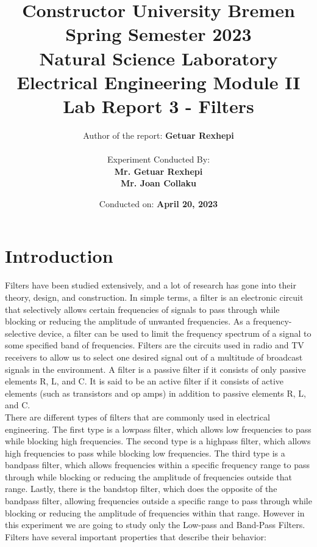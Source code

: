 \documentclass[12pt]{report}
\title{
    \textbf{Constructor University Bremen} \\
Spring Semester 2023 \\
\vspace{1cm}
\textbf{Natural Science Laboratory\\
Electrical Engineering Module II\\}
    \vspace{1cm}
    \textbf{Lab Report 3 - Filters} \\ 
    
}
\author{
    Author of the report: \textbf{Getuar Rexhepi} \\
    \vspace{1cm} \\
    Experiment Conducted By: \\ \textbf{Mr. Getuar Rexhepi} \\
\textbf{Mr. Joan Collaku}
}
\date{Conducted on: \textbf{April 20, 2023}}
\begin{document}
\maketitle 

\chapter{Introduction}
 Filters have been studied extensively, and a lot of research has gone into their theory, design, and construction. In simple terms, a filter is an electronic circuit that selectively allows certain frequencies of signals to pass through while blocking or reducing the amplitude of unwanted frequencies. As a frequency-selective device, a filter can be used to limit the frequency spectrum of a signal to some specified band of frequencies. Filters are the circuits used in radio and TV receivers to allow us to select one desired signal out of a multitude of broadcast signals in the environment. A filter is a passive filter if it consists of only passive elements R, L, and C. It is said to be an active filter if it consists of active elements (such as transistors and op amps) in addition to passive elements R, L, and C. \\
There are different types of filters that are commonly used in electrical engineering. The first type is a lowpass filter, which allows low frequencies to pass while blocking high frequencies. The second type is a highpass filter, which allows high frequencies to pass while blocking low frequencies. The third type is a bandpass filter, which allows frequencies within a specific frequency range to pass through while blocking or reducing the amplitude of frequencies outside that range. Lastly, there is the bandstop filter, which does the opposite of the bandpass filter, allowing frequencies outside a specific range to pass through while blocking or reducing the amplitude of frequencies within that range. However in this experiment we are going to study only the Low-pass and Band-Pass Filters.\\
Filters have several important properties that describe their behavior:
\end{document}
